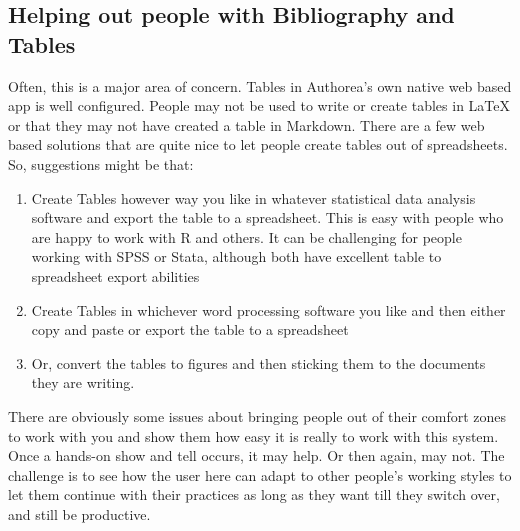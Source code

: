 \subsection{Helping out people with Bibliography and Tables}

Often, this is a major area of concern. Tables in Authorea’s own native web based app is well configured. People may not be used to write or create tables in LaTeX or that they may not have created a table in Markdown. There are a few web based solutions that are quite nice to let people create tables out of spreadsheets. So, suggestions might be that:

\begin{enumerate}
	
\item Create Tables however way you like in whatever statistical data analysis software and export the table to a spreadsheet. This is easy with people who are happy to work with R and others. It can be challenging for people working with SPSS or Stata, although both have excellent table to spreadsheet export abilities
\item Create Tables in whichever word processing software you like and then either copy and paste or export the table to a spreadsheet 
\item Or, convert the tables to figures and then sticking them to the documents they are writing. 
\end{enumerate}


There are obviously some issues about bringing people out of their comfort zones to work with you and show them how easy it is really to work with this system. Once a hands-on show and tell occurs, it may help. Or then again, may not. The challenge is to see how the user here can adapt to other people's working styles to let them continue with their practices as long as they want till they switch over, and still be productive. 




    
    
    
    